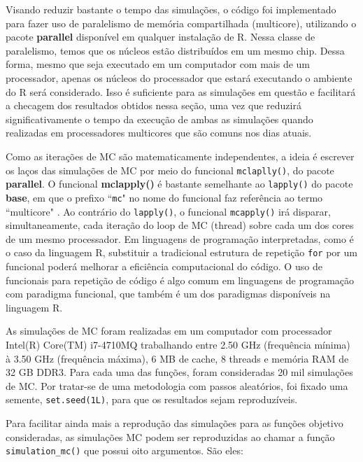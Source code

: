 \documentclass[10pt,letterpaper]{article}
\begin{document}
Visando reduzir bastante o tempo das simulações, o código foi implementado para fazer uso de paralelismo de memória compartilhada (multicore), utilizando o pacote \textbf{parallel} disponível em qualquer instalação de \textsc{R}. Nessa classe de paralelismo, temos que os núcleos estão distribuídos em um mesmo chip. Dessa forma, mesmo que seja executado em um computador com mais de um processador, apenas os núcleos do processador que estará executando o ambiente do \textsc{R} será considerado. Isso é suficiente para as simulações em questão e facilitará a checagem dos resultados obtidos nessa seção, uma vez que reduzirá significativamente o tempo da execução de ambas as simulações quando realizadas em processadores multicores que são comuns nos dias atuais.
 
Como as iterações de MC são matematicamente independentes, a ideia é escrever os laços das simulações de MC por meio do funcional \texttt{mclaplly()}, do pacote \textbf{parallel}. O funcional \textbf{mclapply()} é bastante semelhante ao \texttt{lapply()} do pacote \textbf{base}, em que o prefixo ``\texttt{mc}" no nome do funcional faz referência ao termo ``multicore" . Ao contrário do \texttt{lapply()}, o funcional \texttt{mcapply()} irá disparar, simultaneamente, cada iteração do loop de MC (thread) sobre cada um dos cores de um mesmo processador.  Em linguagens de programação interpretadas, como é o caso da linguagem \textsc{R}, substituir a tradicional estrutura de repetição \texttt{for} por um funcional poderá melhorar a eficiência computacional do código. O uso de funcionais para repetição de código é algo comum em linguagens de programação com paradigma funcional, que também é um dos paradigmas disponíveis na linguagem \textsc{R}.

As simulações de MC foram realizadas em um computador com processador Intel(R) Core(TM) i7-4710MQ trabalhando entre 2.50 GHz (frequência mínima) à 3.50 GHz (frequência máxima), 6 MB de cache, 8 threads e memória RAM de 32 GB DDR3. Para cada uma das funções, foram consideradas 20 mil simulações de MC. Por tratar-se de uma metodologia com passos aleatórios, foi fixado uma semente, \texttt{set.seed(1L)}, para que os resultados sejam reproduzíveis. 

Para facilitar ainda mais a reprodução das simulações para as funções objetivo consideradas, as simulações MC podem ser reproduzidas ao chamar a função \texttt{simulation\_mc()} que possui oito argumentos. São eles:
\end{document}
